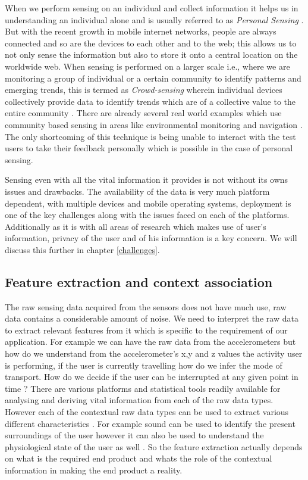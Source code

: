\documentclass[12pt]{report}
\begin{document}
When we perform sensing on an individual and collect information it helps us in understanding an individual alone and is usually referred to as \textit{Personal Sensing} \cite{lane2010survey}. But with the recent growth in mobile internet networks, people are always connected and so are the devices to each other and to the web; this allows us to not only sense the information but also to store it onto a central location on the worldwide web. When sensing is performed on a larger scale i.e., where we are monitoring a group of individual or a certain community to identify patterns and emerging trends, this is termed as \textit{Crowd-sensing} wherein individual devices collectively provide data to identify trends which are of a collective value to the entire community \cite{ganti2011mobile}. There are already several real world examples which use community based sensing in areas like environmental monitoring \cite{dutta2009common} and navigation \cite{mohan2008nericell,hull2006cartel}. The only shortcoming of this technique is being unable to interact with the test users to take their feedback personally which is possible in the case of personal sensing.

Sensing even with all the vital information it provides is not without its owns issues and drawbacks. The availability of the data is very much platform dependent, with multiple devices and mobile operating systems, deployment is one of the key challenges along with the issues faced on each of the platforms. Additionally as it is with all areas of research which makes use of user's information, privacy of the user and of his information is a key concern. We will discuss this further in chapter \ref{challenges}.

\subsection{Feature extraction and context association}
The raw sensing data acquired from the sensors does not have much use, raw data contains a considerable amount of noise. We need to interpret the raw data to extract relevant features from it which is specific to the requirement of our application. For example we can have the raw data from the accelerometers but how do we understand from the accelerometer's x,y and z values the activity user is performing, if the user is currently travelling how do we infer the mode of transport. How do we decide if the user can be interrupted at any given point in time \cite{ho2005using}? There are various platforms and statistical tools readily available for analysing and deriving vital information from each of the raw data types. However each of the contextual raw data types can be used to extract various different characteristics \cite{pejovic2013anticipatory}. For example sound can be used to identify the present surroundings of the user however it can also be used to understand the physiological state of the user as well \cite{lu2012stresssense}. So the feature extraction actually depends on what is the required end product and whats the role of the contextual information in making the end product a reality.
\end{document}

